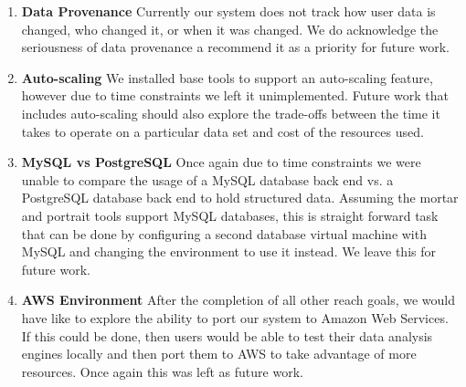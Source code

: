 \begin{enumerate}
  \item \textbf{Data Provenance} Currently our system does not track how
user data is changed, who changed it, or when it was changed. We do
acknowledge the seriousness of data provenance a recommend it as a
priority for future work.
  \item \textbf{Auto-scaling} We installed base tools to support an
auto-scaling feature, however due to time constraints we left it
unimplemented. Future work that includes auto-scaling should also
explore the trade-offs between the time it takes to operate on a
particular data set and cost of the resources used.
  \item \textbf{MySQL vs PostgreSQL} Once again due to time constraints
we were unable to compare the usage of a MySQL database back end vs. a
PostgreSQL database back end to hold structured data. Assuming the
mortar and portrait tools support MySQL databases, this is straight
forward task that can be done by configuring a second database virtual
machine with MySQL and changing the environment to use it instead. We
leave this for future work.
  \item \textbf{AWS Environment} After the completion of all other reach
goals, we would have like to explore the ability to port our system to
Amazon Web Services. If this could be done, then users would be able to
test their data analysis engines locally and then port them to AWS to
take advantage of more resources. Once again this was left as future
work. 
\end{enumerate}

